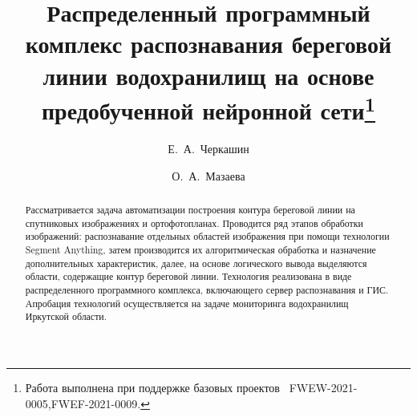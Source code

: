 \usepackage{todonotes}

\usepackage[russian]{nla}


\fi

\title{Распределенный программный комплекс распознавания береговой линии водохранилищ на основе предобученной нейронной 
сети\thanks{Работа выполнена при поддержке базовых проектов \textnumero~FWEW-2021-0005,FWEF-2021-0009.}}
\author{Е.~А.~Черкашин \and О.~А.~Мазаева
}


\maketitle

\begin{abstract}
Рассматривается задача автоматизации построения контура береговой линии на спутниковых изображениях и ортофотопланах. Проводится ряд этапов обработки изображений: распознавание отдельных областей изображения при помощи технологии Segment Anything, затем производится их алгоритмическая обработка и назначение  дополнительных характеристик, далее, на основе логического вывода выделяются области, содержащие контур береговой линии. Технология реализована в виде распределенного программного комплекса, включающего сервер распознавания и ГИС. Апробация технологий осуществляется на задаче мониторинга водохранилищ Иркутской области.

\end{abstract}


